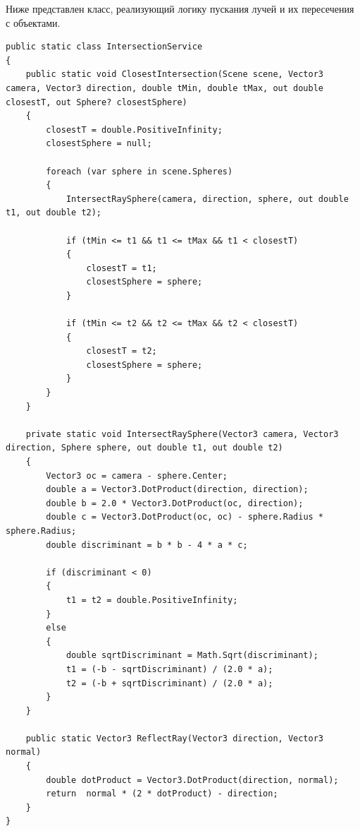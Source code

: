 Ниже представлен класс, реализующий логику пускания лучей и их пересечения с объектами.
\begin{lstlisting}[caption={Класс IntersectionService}, label={lst:3-2}]
public static class IntersectionService
{
	public static void ClosestIntersection(Scene scene, Vector3 camera, Vector3 direction, double tMin, double tMax, out double closestT, out Sphere? closestSphere)
	{
		closestT = double.PositiveInfinity;
		closestSphere = null;
		
		foreach (var sphere in scene.Spheres)
		{
			IntersectRaySphere(camera, direction, sphere, out double t1, out double t2);
			
			if (tMin <= t1 && t1 <= tMax && t1 < closestT)
			{
				closestT = t1;
				closestSphere = sphere;
			}
			
			if (tMin <= t2 && t2 <= tMax && t2 < closestT)
			{
				closestT = t2;
				closestSphere = sphere;
			}
		}
	}
	
	private static void IntersectRaySphere(Vector3 camera, Vector3 direction, Sphere sphere, out double t1, out double t2)
	{
		Vector3 oc = camera - sphere.Center;
		double a = Vector3.DotProduct(direction, direction);
		double b = 2.0 * Vector3.DotProduct(oc, direction);
		double c = Vector3.DotProduct(oc, oc) - sphere.Radius * sphere.Radius;
		double discriminant = b * b - 4 * a * c;
		
		if (discriminant < 0)
		{
			t1 = t2 = double.PositiveInfinity;
		}
		else
		{
			double sqrtDiscriminant = Math.Sqrt(discriminant);
			t1 = (-b - sqrtDiscriminant) / (2.0 * a);
			t2 = (-b + sqrtDiscriminant) / (2.0 * a);
		}
	}
	
	public static Vector3 ReflectRay(Vector3 direction, Vector3 normal)
	{
		double dotProduct = Vector3.DotProduct(direction, normal);
		return  normal * (2 * dotProduct) - direction;
	}
}
\end{lstlisting}

